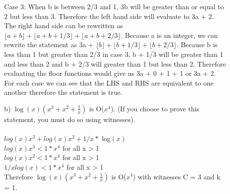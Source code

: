 \documentclass{article}
\begin{document}
\begin{enumerate}
\begin{enumerate}
    Case 3: When b is between 2/3 and 1, 3b will be greater than or equal to 2 but less than 3. Therefore the left hand side will evaluate to 3a + 2. The right hand side can be rewritten as $\lfloor a + b \rfloor + \lfloor a + b + 1/3\rfloor + \lfloor a + b + 2/3\rfloor$. Because a is an integer, we can rewrite the statement as 3a + $\lfloor b \rfloor + \lfloor b + 1/3\rfloor + \lfloor b + 2/3\rfloor$. Because b is less than 1 but greater than 2/3 in case 3, b + 1/3 will be greater than 1 and less than 2 and b + 2/3 will greater than 1 but less than 2. Therefore evaluating the floor functions would give us 3a + 0 + 1 + 1 or 3a + 2.\\
    For each case we can see that the LHS and RHS are equivalent to one another therefore the statement is true.
    \item[b)] $\log(x)({x^3 + x^2+}{\frac{1}{x}})$ is O($x^4$). (If you choose to prove this statement, you must do so using witnesses).\\
    \\$log(x)x^3 + log(x)x^2 + 1/x * $ log$(x)$\\
    $log(x)x^3 < 1 * x^4$ for all x > 1\\
    $log(x)x^2 < 1 * x^4$ for all x > 1\\
    $1/x log(x) < 1 * x^4$ for all x > 1\\
    Therefore $\log(x)({x^3 + x^2+}{\frac{1}{x}})$ is O($x^4$) with witnesses C = 3 and k = 1.
\end{enumerate}


\end{enumerate}
\end{document}
